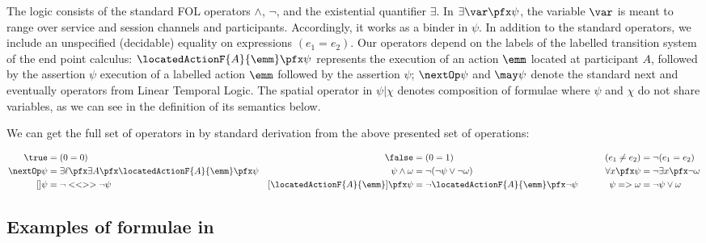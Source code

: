 The logic consists of the standard FOL operators $\land$, $\lnot$,
and the existential quantifier $\exists$. In
$\exists\var\pfx\psi$, the variable $\var$ is meant to range over
service and session channels and participants.  Accordingly, it works
as a binder in $\psi$.  In addition to the standard operators, we
include an unspecified (decidable) equality on expressions
$(e_1=e_2)$.  Our operators depend on the labels of the labelled
transition system of the end point calculus: $\locatedActionF{A}{\emm}
\pfx \psi $ represents the execution of an action $\emm$ located at
participant $A$, followed by the assertion $\psi$ execution of a
labelled action $\emm$ followed by the assertion $\psi $; $\nextOp
\psi$ and $\may \psi$ denote the standard next and eventually
operators from Linear Temporal Logic.  The spatial operator in $\psi |
\chi$ denotes composition of formulae where $\psi$ and $\chi$ do not
share variables, 
as we can see in the definition of its
semantics below.

\begin{remark}
  We can get the full set of operators in \LL by standard derivation
  from the above presented set of operations:

  \begin{alignat*}{3}
    \true & = (0 = 0) &\qquad\qquad
    \false  & = (0 = 1) &\qquad
    (e_1 \neq e_2)  & = \neg (e_1 = e_2) \\
    \nextOp \psi & = \exists \ell \pfx \exists A \pfx
    \locatedActionF{A}{\emm} \pfx \psi  &
   \psi \land \omega  & = \lnot ( \lnot \psi  \lor \lnot \omega) &
    \forall x \pfx \psi   & = \neg \exists x  \pfx \lnot \omega \\
    [] \psi   & = \lnot <<>> \neg \psi &
    [\locatedActionF{A}{\emm}] \pfx \psi & = \neg
    \locatedActionF{A}{\emm} \pfx \neg \psi &
    \psi => \omega & = \lnot \psi \lor \omega 
  \end{alignat*}
\end{remark}


\subsection{Examples of formulae in \texorpdfstring{\LL}{LL}}

